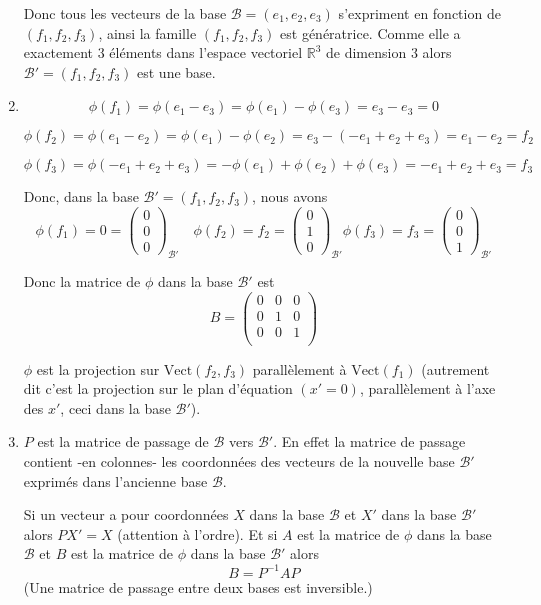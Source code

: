 \documentclass[11pt,a4paper]{article}
\newcommand{\Rr}{\mathbb{R}} \newcommand{\R}{\mathbb{R}}
\begin{document}
\begin{enumerate}
Donc tous les vecteurs de la base $\mathcal{B}=(e_1,e_2,e_3)$ s'expriment en fonction
de $(f_1,f_2,f_3)$, ainsi la famille $(f_1,f_2,f_3)$ est génératrice.
Comme elle a exactement $3$ éléments dans l'espace vectoriel $\Rr^3$ de dimension $3$ alors
$\mathcal{B}'=(f_1,f_2,f_3)$ est une base.


  \item
$$\phi(f_1)=\phi(e_1-e_3)=\phi(e_1)-\phi(e_3)=e_3-e_3=0$$

$$\phi(f_2)=\phi(e_1-e_2)= \phi(e_1)-\phi(e_2)=e_3 - (-e_1+e_2+e_3) = e_1-e_2 = f_2$$

$$\phi(f_3)=\phi(-e_1+e_2+e_3)=-\phi(e_1)+\phi(e_2)+\phi(e_3)=-e_1+e_2+e_3=f_3$$

Donc, dans la base $\mathcal{B}'=(f_1,f_2,f_3)$, nous avons
$$\phi(f_1)=0=\begin{pmatrix}0\\0\\0\end{pmatrix}_{\mathcal{B}'}\quad
\phi(f_2)=f_2=\begin{pmatrix}0\\1\\0\end{pmatrix}_{\mathcal{B}'}
\phi(f_3)=f_3=\begin{pmatrix}0\\0\\1\end{pmatrix}_{\mathcal{B}'}$$

Donc la matrice de $\phi$ dans la base $\mathcal{B}'$ est
$$B=\begin{pmatrix}
0 & 0 & 0 \\
0 & 1 & 0 \\
0 & 0 & 1 \\    
\end{pmatrix}$$

$\phi$ est la projection sur  $\textrm{Vect} (f_2,f_3)$ parallèlement à $\textrm{Vect} (f_1)$ (autrement dit
c'est la projection sur le plan d'équation $(x'=0)$, parallèlement à l'axe des $x'$, ceci dans la base $\mathcal{B}'$).

  \item $P$ est la matrice de passage de $\mathcal{B}$ vers $\mathcal{B}'$.
En effet la matrice de passage contient -en colonnes- les coordonnées des vecteurs
de la nouvelle base $\mathcal{B}'$ exprimés dans l'ancienne base $\mathcal{B}$.


Si un vecteur a pour coordonnées $X$ dans la base $\mathcal{B}$ et $X'$ dans la base $\mathcal{B}'$
alors $PX'=X$ (attention à l'ordre).
Et si $A$ est la matrice de $\phi$ dans la base $\mathcal{B}$ et $B$ est la matrice de $\phi$ dans la base
$\mathcal{B}'$ alors
$$B=P^{-1}AP$$
(Une matrice de passage entre deux bases est inversible.)


\end{enumerate}
\end{document}
